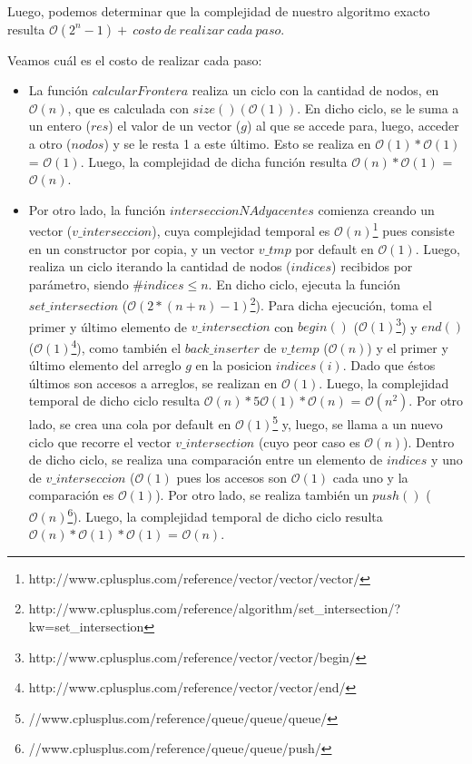Luego, podemos determinar que la complejidad de nuestro algoritmo exacto resulta $\mathcal{O}(2^n - 1) +\ costo\ de\ realizar\ cada\ paso$.

Veamos cuál es el costo de realizar cada paso:
\begin{itemize}
\item La función $calcularFrontera$ realiza un ciclo con la cantidad de nodos, en $\mathcal{O}(n)$, que es calculada con $size() (\mathcal{O}(1))$. En dicho ciclo, se le suma a un entero ($res$) el valor de un vector ($g$) al que se accede para, luego, acceder a otro ($nodos$) y se le resta 1 a este último. Esto se realiza en $\mathcal{O}(1)*\mathcal{O}(1)$ = $\mathcal{O}(1)$. Luego, la complejidad de dicha función resulta $\mathcal{O}(n)*\mathcal{O}(1)$ = $\mathcal{O}(n)$.
\item Por otro lado, la función $interseccionNAdyacentes$ comienza creando un vector ($v\_interseccion$), cuya complejidad temporal es $\mathcal{O}(n)$\footnote{http://www.cplusplus.com/reference/vector/vector/vector/} pues consiste en un constructor por copia, y un vector $v\_tmp$ por default en $\mathcal{O}(1)$. Luego, realiza un ciclo iterando la cantidad de nodos ($indices$) recibidos por parámetro, siendo $\#indices \leq n$. En dicho ciclo, ejecuta la función $set\_intersection$ ($\mathcal{O}(2*(n+n)-1)$\footnote{http://www.cplusplus.com/reference/algorithm/set\_intersection/?kw=set\_intersection}). Para dicha ejecución, toma el primer y último elemento de $v\_intersection$ con $begin()$ ($\mathcal{O}(1)$\footnote{http://www.cplusplus.com/reference/vector/vector/begin/}) y $end()$ ($\mathcal{O}(1)$\footnote{http://www.cplusplus.com/reference/vector/vector/end/}), como también el $back\_inserter$ de $v\_temp$ ($\mathcal{O}(n)$) y el primer y último elemento del arreglo $g$ en la posicion $indices(i)$. Dado que éstos últimos son accesos a arreglos, se realizan en $\mathcal{O}(1)$. Luego, la complejidad temporal de dicho ciclo resulta $\mathcal{O}(n)*5\mathcal{O}(1)*\mathcal{O}(n)$ = $\mathcal{O}(n^2)$.\newline
\newline
Por otro lado, se crea una cola por default en $\mathcal{O}(1)$\footnote{//www.cplusplus.com/reference/queue/queue/queue/} y, luego, se llama a un nuevo ciclo que recorre el vector $v\_intersection$ (cuyo peor caso es $\mathcal{O}(n)$). Dentro de dicho ciclo, se realiza una comparación entre un elemento de $indices$ y uno de $v\_interseccion$ ($\mathcal{O}(1)$ pues los accesos son $\mathcal{O}(1)$ cada uno y la comparación es $\mathcal{O}(1)$). Por otro lado, se realiza también un $push()$ ($\mathcal{O}(n)$\footnote{//www.cplusplus.com/reference/queue/queue/push/}). Luego, la complejidad temporal de dicho ciclo resulta $\mathcal{O}(n)*\mathcal{O}(1)*\mathcal{O}(1)$ = $\mathcal{O}(n)$.\newline

\end{itemize}
